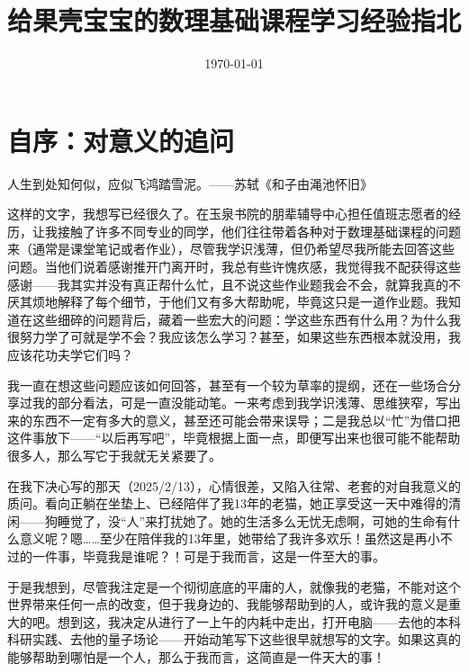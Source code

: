 \documentclass{ctexart}
\title{给果壳宝宝的数理基础课程学习经验指北}
\author{}
\date{\today}
\begin{document}
\setlength{\parindent}{2em}

\maketitle
\tableofcontents
\newpage
\section{自序：对意义的追问}
\vspace{0.5cm}
{\hfill \kaishu 人生到处知何似，应似飞鸿踏雪泥。——苏轼《和子由渑池怀旧》}
\vspace{0.5cm}

这样的文字，我想写已经很久了。在玉泉书院的朋辈辅导中心担任值班志愿者的经历，让我接触了许多不同专业的同学，他们往往带着各种对于数理基础课程的问题来（通常是课堂笔记或者作业），尽管我学识浅薄，但仍希望尽我所能去回答这些问题。当他们说着感谢推开门离开时，我总有些许愧疚感，我觉得我不配获得这些感谢——我其实并没有真正帮什么忙，且不说这些作业题我会不会，就算我真的不厌其烦地解释了每个细节，于他们又有多大帮助呢，毕竟这只是一道作业题。我知道在这些细碎的问题背后，藏着一些宏大的问题：学这些东西有什么用？为什么我很努力学了可就是学不会？我应该怎么学习？甚至，如果这些东西根本就没用，我应该花功夫学它们吗？

我一直在想这些问题应该如何回答，甚至有一个较为草率的提纲，还在一些场合分享过我的部分看法，可是一直没能动笔。一来考虑到我学识浅薄、思维狭窄，写出来的东西不一定有多大的意义，甚至还可能会带来误导；二是我总以“忙”为借口把这件事放下——“以后再写吧”，毕竟根据上面一点，即便写出来也很可能不能帮助很多人，那么写它于我就无关紧要了。

在我下决心写的那天（2025/2/13），心情很差，又陷入往常、老套的对自我意义的质问。看向正躺在坐垫上、已经陪伴了我13年的老猫，她正享受这一天中难得的清闲——狗睡觉了，没“人”来打扰她了。她的生活多么无忧无虑啊，可她的生命有什么意义呢？嗯……至少在陪伴我的13年里，她带给了我许多欢乐！虽然这是再小不过的一件事，毕竟我是谁呢？！可是于我而言，这是一件至大的事。

于是我想到，尽管我注定是一个彻彻底底的平庸的人，就像我的老猫，不能对这个世界带来任何一点的改变，但于我身边的、我能够帮助到的人，或许我的意义是重大的吧。想到这，我决定从进行了一上午的内耗中走出，打开电脑——去他的本科科研实践、去他的量子场论——开始动笔写下这些很早就想写的文字。如果这真的能够帮助到哪怕是一个人，那么于我而言，这简直是一件天大的事！
\end{document}
